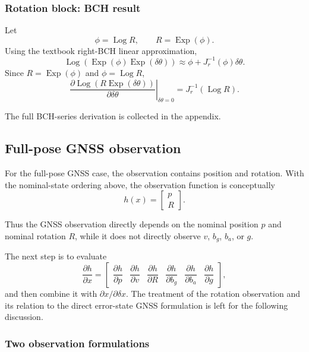 \documentclass[11pt]{article}
\numberwithin{equation}{section}
\newcommand{\Exp}{\operatorname{Exp}}
\newcommand{\Log}{\operatorname{Log}}
\begin{document}
\subsubsection*{Rotation block: BCH result}

Let
\[
\phi=\Log R,
\qquad
R=\Exp(\phi).
\]
Using the textbook right-BCH linear approximation,
\begin{equation}
\boxed{
\Log\!\left(\Exp(\phi)\Exp(\delta\theta)\right)
\approx
\phi+J_r^{-1}(\phi)\delta\theta.
}
\end{equation}
Since $R=\Exp(\phi)$ and $\phi=\Log R$,
\begin{equation}
\boxed{
\left.
\frac{\partial\Log(R\Exp(\delta\theta))}
{\partial\delta\theta}
\right|_{\delta\theta=0}
=
J_r^{-1}(\Log R).
}
\end{equation}

The full BCH-series derivation is collected in the appendix.


\subsection{Full-pose GNSS observation}

For the full-pose GNSS case, the observation contains position and
rotation. With the nominal-state ordering above, the observation
function is conceptually
\begin{equation}
\boxed{
h(x)
=
\begin{bmatrix}
p\\
R
\end{bmatrix}.
}
\end{equation}

Thus the GNSS observation directly depends on the nominal position
$p$ and nominal rotation $R$, while it does not directly observe
$v$, $b_g$, $b_a$, or $g$.

The next step is to evaluate
\[
\frac{\partial h}{\partial x}
=
\begin{bmatrix}
\dfrac{\partial h}{\partial p}
&
\dfrac{\partial h}{\partial v}
&
\dfrac{\partial h}{\partial R}
&
\dfrac{\partial h}{\partial b_g}
&
\dfrac{\partial h}{\partial b_a}
&
\dfrac{\partial h}{\partial g}
\end{bmatrix},
\]
and then combine it with
$\partial x/\partial\delta x$. The treatment of the rotation
observation and its relation to the direct error-state GNSS
formulation is left for the following discussion.



\subsubsection*{Two observation formulations}
\end{document}
